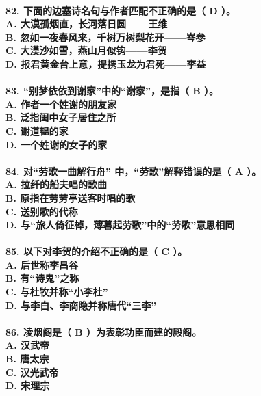 \documentclass[UTF8]{ctexart} %
\begin{document}
\paragraph{
82. 下面的边塞诗名句与作者匹配不正确的是（ \color{red}D\color{black} ）。 \\
    A. 大漠孤烟直，长河落日圆——王维 \\
    B. 忽如一夜春风来，千树万树梨花开——岑参 \\
    C. 大漠沙如雪，燕山月似钩——李贺 \\
    D. 报君黄金台上意，提携玉龙为君死——李益
}
\paragraph{
83. “别梦依依到谢家”中的“谢家”，是指（ \color{red}B\color{black} ）。 \\
    A. 作者一个姓谢的朋友家 \\
    B. 泛指闺中女子居住之所 \\
    C. 谢道韫的家 \\
    D. 一个姓谢的女子的家
}
\paragraph{
84. 对“劳歌一曲解行舟” 中，“劳歌”解释错误的是（ \color{red}A\color{black} ）。 \\
    A. 拉纤的船夫唱的歌曲 \\
    B. 原指在劳劳亭送客时唱的歌 \\
    C. 送别歌的代称 \\
    D. 与“旅人倚征棹，薄暮起劳歌”中的“劳歌”意思相同
}
\paragraph{
85. 以下对李贺的介绍不正确的是（ \color{red}C\color{black} ）。 \\
    A. 后世称李昌谷 \\
    B. 有“诗鬼”之称 \\
    C. 与杜牧并称“小李杜” \\
    D. 与李白、李商隐并称唐代“三李”
}
\paragraph{
86. 凌烟阁是（ \color{red}B\color{black} ）为表彰功臣而建的殿阁。 \\
    A. 汉武帝 \\
    B. 唐太宗 \\
    C. 汉光武帝 \\
    D. 宋理宗
}
\end{document}
